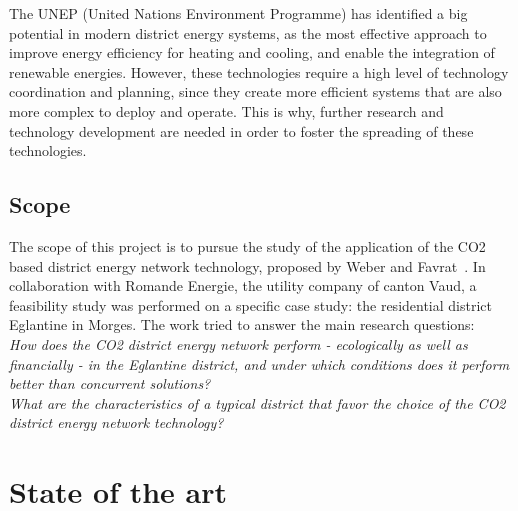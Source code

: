 \documentclass{article}
\begin{document}
The UNEP (United Nations Environment Programme) has identified a big potential in modern district energy systems, as the most effective approach to improve energy efficiency for heating and cooling, and enable the integration of renewable energies. However, these technologies require a high level of technology coordination and planning, since they create more efficient systems that are also more complex to deploy and operate. This is why, further research and technology development are needed in order to foster the spreading of these technologies.


\subsection{Scope}
The scope of this project is to pursue the study of the application of the CO2 based district energy network technology, proposed by Weber and Favrat~\cite{weberConventionalAdvancedCO22010}. In collaboration with Romande Energie, the utility company of canton Vaud, a feasibility study was performed on a specific case study: the residential district Eglantine in Morges. The work tried to answer the main research questions:\\

\textit{How does the CO2 district energy network perform - ecologically as well as financially - in the Eglantine district, and under which conditions does it perform better than concurrent solutions?}\\

\textit{What are the characteristics of a typical district that favor the choice of the CO2 district energy network technology?}

\newpage
\section{State of the art}
\end{document}

